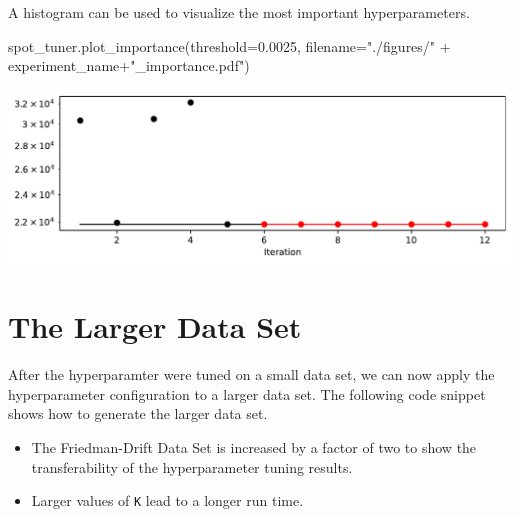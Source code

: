 \documentclass[
  letterpaper,
  DIV=11,
  numbers=noendperiod]{scrreprt}
\newenvironment{Shaded}{\begin{snugshade}}{\end{snugshade}}
\newcommand{\FloatTok}[1]{\textcolor[rgb]{0.68,0.00,0.00}{#1}}
\newcommand{\NormalTok}[1]{\textcolor[rgb]{0.00,0.23,0.31}{#1}}
\newcommand{\OperatorTok}[1]{\textcolor[rgb]{0.37,0.37,0.37}{#1}}
\newcommand{\StringTok}[1]{\textcolor[rgb]{0.13,0.47,0.30}{#1}}
\providecommand{\tightlist}{%
  \setlength{\itemsep}{0pt}\setlength{\parskip}{0pt}}\usepackage{longtable,booktabs,array}
\begin{document}
A histogram can be used to visualize the most important hyperparameters.

\begin{Shaded}
\begin{Highlighting}[]
\NormalTok{spot\_tuner.plot\_importance(threshold}\OperatorTok{=}\FloatTok{0.0025}\NormalTok{, filename}\OperatorTok{=}\StringTok{"./figures/"} \OperatorTok{+}\NormalTok{ experiment\_name}\OperatorTok{+}\StringTok{"\_importance.pdf"}\NormalTok{)}
\end{Highlighting}
\end{Shaded}

\includegraphics{024_spot_hpt_river_friedman_hatr_files/figure-pdf/cell-21-output-1.pdf}

\section{The Larger Data Set}\label{the-larger-data-set}

After the hyperparamter were tuned on a small data set, we can now apply
the hyperparameter configuration to a larger data set. The following
code snippet shows how to generate the larger data set.

\begin{tcolorbox}[enhanced jigsaw, coltitle=black, bottomrule=.15mm, breakable, toprule=.15mm, colframe=quarto-callout-caution-color-frame, title=\textcolor{quarto-callout-caution-color}{\faFire}\hspace{0.5em}{Caution: Increased Friedman-Drift Data Set}, colbacktitle=quarto-callout-caution-color!10!white, opacityback=0, left=2mm, leftrule=.75mm, colback=white, rightrule=.15mm, bottomtitle=1mm, toptitle=1mm, titlerule=0mm, arc=.35mm, opacitybacktitle=0.6]

\begin{itemize}
\tightlist
\item
  The Friedman-Drift Data Set is increased by a factor of two to show
  the transferability of the hyperparameter tuning results.
\item
  Larger values of \texttt{K} lead to a longer run time.
\end{itemize}

\end{tcolorbox}
\end{document}
